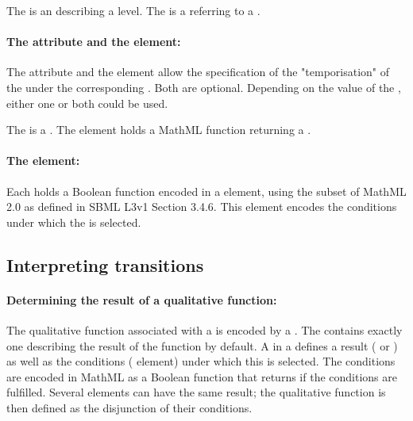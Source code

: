 The  is an  describing a level. The  is a  referring to a .

\paragraph{The  attribute and the  element:}
The attribute  and the element  allow the specification of the "temporisation" of the  under the corresponding . Both are optional. Depending on the value of the , either one or both could be used.

The  is a . The element  holds a MathML function returning a . 

\paragraph{The  element:}
Each  holds a Boolean function encoded in a  element, using the subset of MathML 2.0 as defined in SBML L3v1 Section 3.4.6.
This element encodes the conditions under which the  is selected.


\bigskip
\subsection*{\hypertarget{inter_trans}{Interpreting transitions}} %

\paragraph{Determining the result of a qualitative function:}
The qualitative function associated with a  is encoded by a . The  contains exactly one  describing the result of the function by default. A  in a  defines a result ( or ) as well as the conditions ( element) under which this  is selected.
The conditions are encoded in MathML as a Boolean function that returns  if the conditions are fulfilled.
Several  elements can have the same result; the qualitative function is then defined as the disjunction of their conditions. 

